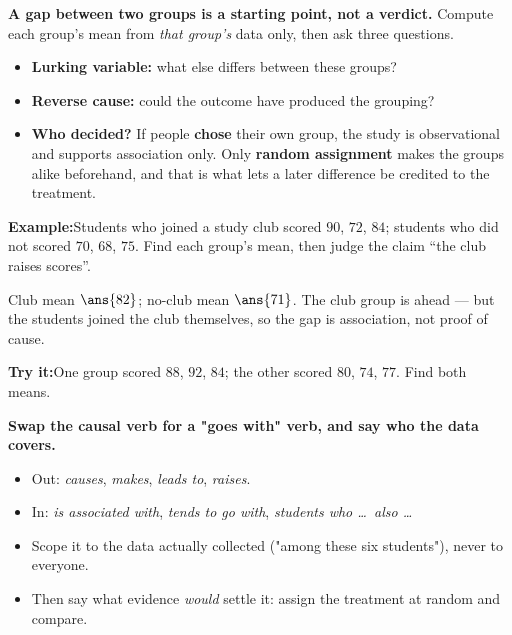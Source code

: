 \documentclass[12pt]{article}
\begin{document}
\begin{formulabox}
\textbf{A gap between two groups is a starting point, not a verdict.} Compute
each group's mean from \emph{that group's} data only, then ask three questions.
\begin{itemize}[leftmargin=0.8cm, itemsep=1pt, topsep=2pt]
  \item \textbf{Lurking variable:} what else differs between these groups?
  \item \textbf{Reverse cause:} could the outcome have produced the grouping?
  \item \textbf{Who decided?} If people \textbf{chose} their own group, the study
        is observational and supports association only. Only \textbf{random
        assignment} makes the groups alike beforehand, and that is what lets a
        later difference be credited to the treatment.
\end{itemize}
\end{formulabox}

\begin{examplebox}
\textbf{Example:}\quad Students who joined a study club scored $90$, $72$, $84$;
students who did not scored $70$, $68$, $75$. Find each group's mean, then judge
the claim ``the club raises scores''.



Club mean $\ans{82}$; no-club mean $\ans{71}$. The club group is ahead --- but
the students joined the club themselves, so the gap is association, not proof of
cause.
\end{examplebox}

\begin{tryitbox}
\textbf{Try it:}\quad One group scored $88$, $92$, $84$; the other scored $80$,
$74$, $77$. Find both means.

\end{tryitbox}


\begin{formulabox}
\textbf{Swap the causal verb for a "goes with" verb, and say who the data
covers.}
\begin{itemize}[leftmargin=0.8cm, itemsep=1pt, topsep=2pt]
  \item Out: \emph{causes}, \emph{makes}, \emph{leads to}, \emph{raises}.
  \item In: \emph{is associated with}, \emph{tends to go with}, \emph{students
        who \dots\ also \dots}
  \item Scope it to the data actually collected ("among these six students"),
        never to everyone.
  \item Then say what evidence \emph{would} settle it: assign the treatment at
        random and compare.
\end{itemize}
\end{formulabox}
\end{document}
